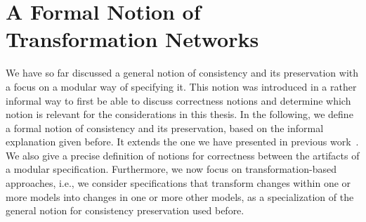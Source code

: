 \section{A Formal Notion of Transformation Networks}
\label{chap:correctness:formalization}

We have so far discussed a general notion of consistency and its preservation with a focus on a modular way of specifying it.
This notion was introduced in a rather informal way to first be able to discuss correctness notions and determine which notion is relevant for the considerations in this thesis.
In the following, we define a formal notion of consistency and its preservation, based on the informal explanation given before.
It extends the one we have presented in previous work~.
We also give a precise definition of notions for correctness between the artifacts of a modular specification.
Furthermore, we now focus on transformation-based approaches, i.e., we consider specifications that transform changes within one or more models into changes in one or more other models, as a specialization of the general notion for consistency preservation used before.

